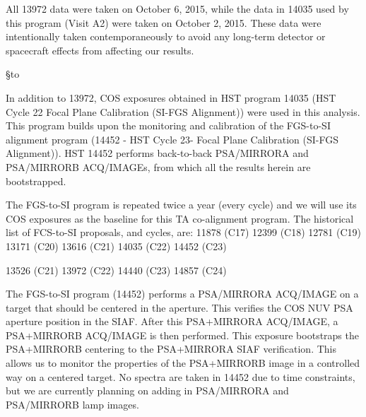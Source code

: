 \documentclass[12pt]{reportj}
\def\ssection#1{\addtocounter{section}{1} \setcounter{subsection}{0} \S*{\hbox to \hsize{\large\bf \arabic{section}. #1\hfill }}}
\begin{document}
All 13972 data were taken on October 6, 2015, while the data in 14035 used by this program (Visit A2) were taken on October 2, 2015.
These data were intentionally taken contemporaneously to avoid any long-term detector or spacecraft effects from affecting our results.\\

\newpage

\lhead{}
\rhead{}

\clearpage
\ssection{Program Descriptions \label{sec:programs} }

In addition to 13972, COS exposures obtained in HST program 14035 (HST Cycle 22 Focal Plane Calibration (SI-FGS Alignment)) were used in this analysis.
This program builds upon the monitoring and calibration of the FGS-to-SI alignment program (14452 - HST Cycle 23- Focal Plane Calibration (SI-FGS Alignment)).  HST 14452 performs back-to-back PSA/MIRRORA and PSA/MIRRORB ACQ/IMAGEs, from which all the results herein are bootstrapped.

The FGS-to-SI program is repeated twice a year (every cycle) and we will use its COS exposures as the baseline for this TA co-alignment program. The historical list of FCS-to-SI proposals, and cycles, are:
11878 (C17)
12399 (C18)
12781 (C19)
13171 (C20)
13616 (C21)
14035 (C22)
14452 (C23)

13526 (C21)
13972 (C22)
14440 (C23)
14857 (C24)

The FGS-to-SI program (14452) performs a PSA/MIRRORA ACQ/IMAGE on a target that should be centered in the aperture.
This verifies the COS NUV PSA aperture position in the SIAF. After this PSA+MIRRORA ACQ/IMAGE, a PSA+MIRRORB ACQ/IMAGE is then performed.
This exposure bootstraps the PSA+MIRRORB centering to the PSA+MIRRORA SIAF verification.
This allows us to monitor the properties of the PSA+MIRRORB image in a controlled way on a centered target.
No spectra are taken in 14452 due to time constraints, but we are currently planning on adding in PSA/MIRRORA and PSA/MIRRORB lamp images.
\end{document}
